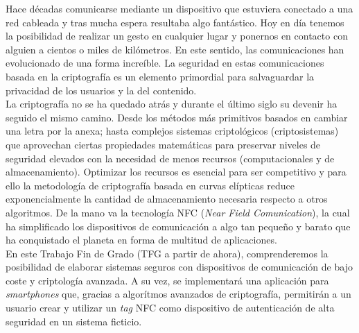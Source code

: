 \documentclass[../PFC.tex]{subfiles}
\begin{document}

Hace décadas comunicarse mediante un dispositivo que estuviera conectado a una red cableada y tras mucha espera resultaba algo fantástico. Hoy en día tenemos la posibilidad de realizar un gesto en cualquier lugar y ponernos en contacto con alguien a cientos o miles de kilómetros. En este sentido, las comunicaciones han evolucionado de una forma increíble. La seguridad en estas comunicaciones basada en la criptografía es un elemento primordial para salvaguardar la privacidad de los usuarios y la del contenido.\\

La criptografía no se ha quedado atrás y durante el último siglo su devenir ha seguido el mismo camino. Desde los métodos más primitivos basados en cambiar una letra por la anexa; hasta complejos sistemas criptológicos (criptosistemas) que aprovechan ciertas propiedades matemáticas para preservar niveles de seguridad elevados con la necesidad de menos recursos (computacionales y de almacenamiento). Optimizar los recursos es esencial para ser competitivo y para ello la metodología de criptografía basada en curvas elípticas reduce exponencialmente la cantidad de almacenamiento necesaria respecto a otros algoritmos. De la mano va la tecnología NFC (\textit{Near Field Comunication}), la cual ha simplificado los dispositivos de comunicación a algo tan pequeño y barato que ha conquistado el planeta en forma de multitud de aplicaciones.\\

En este Trabajo Fin de Grado (TFG a partir de ahora), comprenderemos la posibilidad de elaborar sistemas seguros con dispositivos de comunicación de bajo coste y criptología avanzada. A su vez, se implementará una aplicación para \textit{smartphones} que, gracias a algorítmos avanzados de criptografía, permitirán a un usuario crear y utilizar un \textit{tag} NFC como dispositivo de autenticación de alta seguridad en un sistema ficticio.
\end{document}
